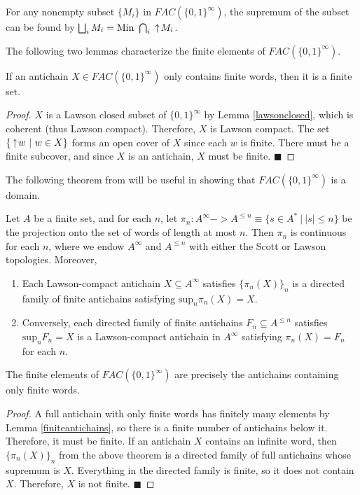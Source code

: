 \begin{fact} \label{antichainsup}
For any nonempty subset $\{M_{i}\}$ in $FAC(\{0,1\}^\infty)$, the supremum of the subset can be found by $\bigsqcup_{i} M_i = \textup{\textrm{Min}}\  \bigcap_{i} \,\uparrow\! M_{i}$.
\end{fact}
The following two lemmas characterize the finite elements of $FAC(\{0,1\}^\infty)$.
\begin{lemma}\label{finiteantichains}
If an antichain $X\in FAC(\{0,1\}^\infty)$ only contains finite words, then it is a finite set.
\end{lemma}
\begin{proof}
$X$ is a Lawson closed subset of $\{0,1\}^\infty$ by Lemma \ref{lawsonclosed}, which is coherent (thus Lawson compact).  Therefore, $X$ is Lawson compact.  The set $\{\,\uparrow\! w\ |\ w\in X\}$ forms an open cover of $X$ since each $w$ is finite.  There must be a finite subcover, and since $X$ is an antichain, $X$ must be finite. \hfill $\blacksquare$
\end{proof}

The following theorem from \cite{mislove2014anatomy} will be useful in showing that $FAC(\{0,1\}^\infty)$ is a domain.

\begin{theorem}\label{AntichainProjections}
Let $A$ be a finite set, and for each $n$, let $\pi_n : A^\infty -> A^{\leq n} \equiv
\{s \in A^{*}\ |\ |s| \leq n\}$ be the projection onto the set of words of length at most $n$.
Then $\pi_n$ is continuous for each $n$, where we endow $A^\infty$ and $A^{\leq n}$ with either the
Scott or Lawson topologies. Moreover,
\begin{enumerate}
\item Each Lawson-compact antichain $X \subseteq A^\infty$ satisfies $\{\pi_n(X)\}_n$ is a directed
family of finite antichains satisfying $\mathrm{sup}_n \pi_n(X) = X$.
\item Conversely, each directed family of finite antichains $F_n \subseteq A^{\leq n}$ satisfies
$\mathrm{sup}_n F_n = X$ is a Lawson-compact antichain in $A^\infty$ satisfying $\pi_n(X) = F_n$
for each $n$.
\end{enumerate}
\end{theorem}

\begin{lemma}
The finite elements of $FAC(\{0,1\}^\infty)$ are precisely the antichains containing only finite words.
\end{lemma}
\begin{proof}
A full antichain with only finite words has finitely many elements by Lemma \ref{finiteantichains}, so there is a finite number of antichains below it.  Therefore, it must be finite.  If an antichain $X$ contains an infinite word, then $\{\pi_n(X)\}_n$ from the above theorem is a directed family of full antichains whose supremum is $X$.  Everything in the directed family is finite, so it does not contain $X$.  Therefore, $X$ is not finite.
\hfill $\blacksquare$
\end{proof}

